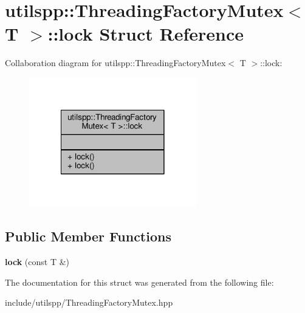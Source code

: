 \hypertarget{structutilspp_1_1ThreadingFactoryMutex_1_1lock}{\section{utilspp\-:\-:Threading\-Factory\-Mutex$<$ T $>$\-:\-:lock Struct Reference}
\label{structutilspp_1_1ThreadingFactoryMutex_1_1lock}
}


Collaboration diagram for utilspp\-:\-:Threading\-Factory\-Mutex$<$ T $>$\-:\-:lock\-:
\nopagebreak
\begin{figure}[H]
\begin{center}
\leavevmode
\includegraphics[width=206pt]{structutilspp_1_1ThreadingFactoryMutex_1_1lock__coll__graph}
\end{center}
\end{figure}
\subsection*{Public Member Functions}
\begin{DoxyCompactItemize}
\item 
\hypertarget{structutilspp_1_1ThreadingFactoryMutex_1_1lock_a49402934851bb021ed42e15af18d6786}{{\bfseries lock} (const T \&)}\label{structutilspp_1_1ThreadingFactoryMutex_1_1lock_a49402934851bb021ed42e15af18d6786}

\end{DoxyCompactItemize}


The documentation for this struct was generated from the following file\-:\begin{DoxyCompactItemize}
\item 
include/utilspp/Threading\-Factory\-Mutex.\-hpp\end{DoxyCompactItemize}
